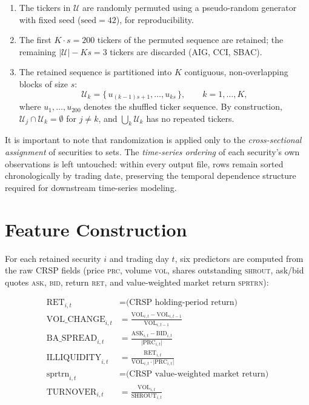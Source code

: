 \documentclass[11pt]{article}
\begin{document}
\begin{enumerate}
  \item The tickers in $\mathcal{U}$ are randomly permuted using a
        pseudo-random generator with fixed seed ($\text{seed} = 42$), for
        reproducibility.
  \item The first $K \cdot s = 200$ tickers of the permuted sequence are
        retained; the remaining $|\mathcal{U}| - K s = 3$ tickers are
        discarded (AIG, CCI, SBAC).
  \item The retained sequence is partitioned into $K$ contiguous,
        non-overlapping blocks of size $s$:
        \begin{equation}
          \mathcal{U}_k = \{\, u_{(k-1)s+1}, \dots, u_{ks} \,\}, \qquad k = 1,\dots,K,
        \end{equation}
        where $u_1,\dots,u_{200}$ denotes the shuffled ticker sequence.
        By construction, $\mathcal{U}_j \cap \mathcal{U}_k = \emptyset$ for
        $j \neq k$, and $\bigcup_k \mathcal{U}_k$ has no repeated tickers.
\end{enumerate}

It is important to note that randomization is applied only to the
\emph{cross-sectional assignment} of securities to sets. The
\emph{time-series ordering} of each security's own observations is left
untouched: within every output file, rows remain sorted chronologically by
trading date, preserving the temporal dependence structure required for
downstream time-series modeling.

\section{Feature Construction}

For each retained security $i$ and trading day $t$, six predictors are
computed from the raw CRSP fields (price \textsc{prc}, volume
\textsc{vol}, shares outstanding \textsc{shrout}, ask/bid quotes
\textsc{ask}, \textsc{bid}, return \textsc{ret}, and value-weighted market
return \textsc{sprtrn}):

\begin{align}
  \text{RET}_{i,t}          &= \text{(CRSP holding-period return)} \\
  \text{VOL\_CHANGE}_{i,t}  &= \frac{\text{VOL}_{i,t} - \text{VOL}_{i,t-1}}{\text{VOL}_{i,t-1}} \\
  \text{BA\_SPREAD}_{i,t}   &= \frac{\text{ASK}_{i,t} - \text{BID}_{i,t}}{\lvert\text{PRC}_{i,t}\rvert} \\
  \text{ILLIQUIDITY}_{i,t}  &= \frac{\text{RET}_{i,t}}{\text{VOL}_{i,t}\cdot\lvert\text{PRC}_{i,t}\rvert} \\
  \text{sprtrn}_{i,t}       &= \text{(CRSP value-weighted market return)} \\
  \text{TURNOVER}_{i,t}     &= \frac{\text{VOL}_{i,t}}{\text{SHROUT}_{i,t}}
\end{align}
\end{document}
